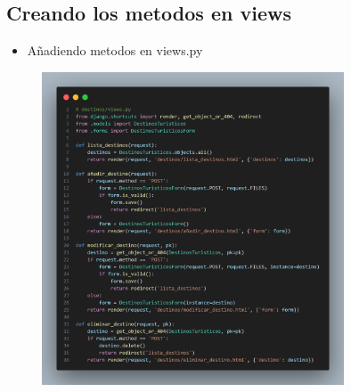 \documentclass{article}
\begin{document}
	\subsection{Creando los metodos en views}
    \begin{itemize}
		\item Añadiendo metodos en views.py
	\end{itemize}
	\begin{figure}[H]
		\centering
		\includegraphics[width=0.8\textwidth,keepaspectratio]{img/views.png}
	\end{figure}
\end{document}
